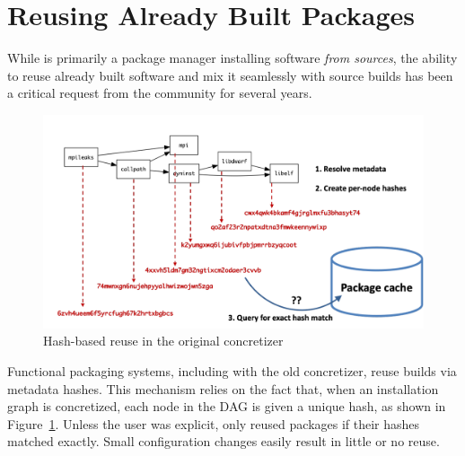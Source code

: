 \section{Reusing Already Built Packages}
\label{sec:reuse}

While \spack{} is primarily a package manager installing software \emph{from sources},
the ability to reuse already built software and mix it seamlessly with source builds has
been a critical request from the community for several years.

\begin{figure}[htb]
  \centering
  \includegraphics[width=.8\columnwidth]{figures/hash-cache.pdf}
  \caption{Hash-based reuse in the original \spack concretizer}
  \label{fig:hash_reuse}
\end{figure}

Functional packaging systems, including \spack{} with the old concretizer, reuse builds
via metadata hashes. This mechanism relies on the fact that, when an installation graph
is concretized, each node in the DAG is given a unique hash, as shown in
Figure~\ref{fig:hash_reuse}.
Unless the user was explicit, \spack{} only reused packages if their hashes matched
exactly. Small configuration changes easily result in little or no reuse.


